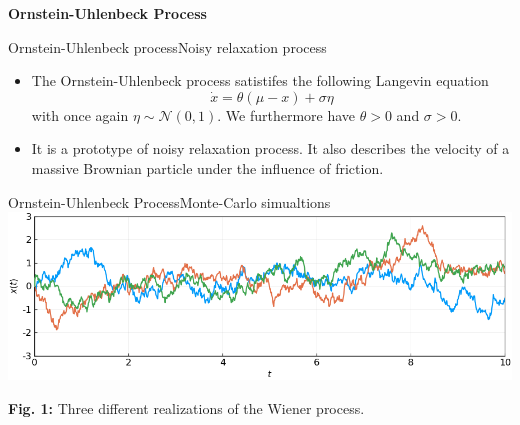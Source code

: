 \documentclass[usenames,dvipsnames,svgnames,10pt,aspectratio=169]{beamer}
\begin{document}

\begin{frame}[t, c]{}
	\centering
	\vspace{1cm}

	{\Large \textbf{Ornstein-Uhlenbeck Process}}

	\bigskip

	{}

\end{frame}

\begin{frame}[t, c]{Ornstein-Uhlenbeck process}{Noisy relaxation process}
	\begin{itemize}
		\item The Ornstein-Uhlenbeck process satistifes the following Langevin equation
		$$
		\dot{x} = \theta \left( \mu - x \right) + \sigma \eta
		$$
		with once again $\eta \sim \mathcal{N}(0, 1)$. We furthermore have $\theta > 0$ and $\sigma > 0$.

		\medskip

		\item It is a prototype of noisy relaxation process. It also describes the velocity of a massive Brownian particle under the influence of friction.
	\end{itemize}

	\vspace{1cm}
\end{frame}

\begin{frame}[t, c]{Ornstein-Uhlenbeck Process}{Monte-Carlo simualtions}
	\centering
	\includegraphics[width=.8\textwidth]{orstein_uhlenbeck_processes}

	\textbf{Fig. 1:} Three different realizations of the Wiener process.

	\vspace{1cm}
\end{frame}
\end{document}
